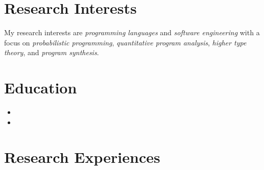 \documentclass[11pt,letterpaper,sans]{moderncv}        %
\begin{document}
\makecvtitle


\vspace{-3em}

\section{Research Interests}

My research interests are \emph{programming languages} and \emph{software engineering} with a focus on \emph{probabilistic programming}, \emph{quantitative program analysis}, \emph{higher type theory}, and \emph{program synthesis}.

\section{Education}

\begin{itemize}
	\item{}
	
	\vspace{2pt}
	
	\item{}
\end{itemize}

\section{Research Experiences}
\end{document}
